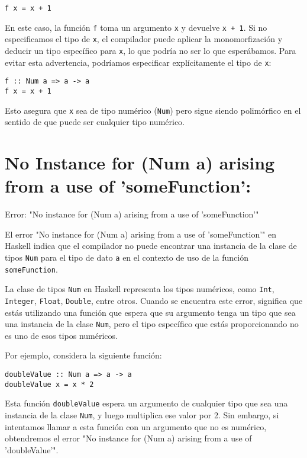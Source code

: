 \documentclass{article}
\begin{document}
\begin{verbatim}
f x = x + 1
\end{verbatim}

En este caso, la función \texttt{f} toma un argumento \texttt{x} y devuelve \texttt{x + 1}. Si no especificamos el tipo de \texttt{x}, el compilador puede aplicar la monomorfización y deducir un tipo específico para \texttt{x}, lo que podría no ser lo que esperábamos. Para evitar esta advertencia, podríamos especificar explícitamente el tipo de \texttt{x}:

\begin{verbatim}
f :: Num a => a -> a
f x = x + 1
\end{verbatim}

Esto asegura que \texttt{x} sea de tipo numérico (\texttt{Num}) pero sigue siendo polimórfico en el sentido de que puede ser cualquier tipo numérico.

\newpage
\section{No Instance for (Num a) arising from a use of 'someFunction':}

\begin{mdframed}[backgroundcolor=red!40,shadow=true,shadowsize=2pt,roundcorner=2pt]
    Error: "No instance for (Num a) arising from a use of 'someFunction'"
\end{mdframed}

El error "No instance for (Num a) arising from a use of 'someFunction'" en Haskell indica que el compilador no puede encontrar una instancia de la clase de tipos \texttt{Num} para el tipo de dato \texttt{a} en el contexto de uso de la función \texttt{someFunction}.

La clase de tipos \texttt{Num} en Haskell representa los tipos numéricos, como \texttt{Int}, \texttt{Integer}, \texttt{Float}, \texttt{Double}, entre otros. Cuando se encuentra este error, significa que estás utilizando una función que espera que su argumento tenga un tipo que sea una instancia de la clase \texttt{Num}, pero el tipo específico que estás proporcionando no es uno de esos tipos numéricos.

Por ejemplo, considera la siguiente función:

\begin{verbatim}
doubleValue :: Num a => a -> a
doubleValue x = x * 2
\end{verbatim}

Esta función \texttt{doubleValue} espera un argumento de cualquier tipo que sea una instancia de la clase \texttt{Num}, y luego multiplica ese valor por 2. Sin embargo, si intentamos llamar a esta función con un argumento que no es numérico, obtendremos el error "No instance for (Num a) arising from a use of 'doubleValue'".
\end{document}
